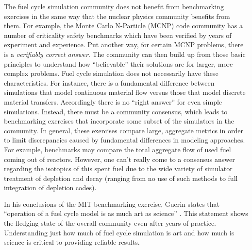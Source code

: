 The fuel cycle simulation community does not benefit from benchmarking exercises
in the same way that the nuclear physics community benefits from them. For
example, the Monte Carlo N-Particle (MCNP) code community has a number of
criticality safety benchmarks \cite{wagner_mcnp:_1992} which have been verified
by years of experiment and experience. Put another way, for certain MCNP
problems, there is a \textit{verifiably correct answer}. The community can then
build up from those basic principles to understand how ``believable'' their
solutions are for larger, more complex problems. Fuel cycle simulation does not
necessarily have these characteristics. For instance, there is a fundamental
difference between simulations that model continuous material flow versus those
that model discrete material transfers. Accordingly there is no ``right answer''
for even simple simulations. Instead, there must be a community consensus, which
leads to benchmarking exercises that incorporate some subset of the simulators
in the community. In general, these exercises compare large, aggregate metrics
in order to limit discrepancies caused by fundamental differences in modeling
approaches. For example, benchmarks may compare the total aggregate flow of used
fuel coming out of reactors. However, one can't really come to a consensus
answer regarding the isotopics of this spent fuel due to the wide variety of
simulator treatment of depletion and decay (ranging from no use of such methods
to full integration of depletion codes).

In his conclusions of the MIT benchmarking exercise, Guerin states that
``operation of a fuel cycle model is as much art as science''
\cite{guerin_benchmark_2009}. This statement shows the fledging state of the
overall community even after years of practice. Understanding just how much of
fuel cycle simulation is art and how much is science is critical to providing
reliable results.
